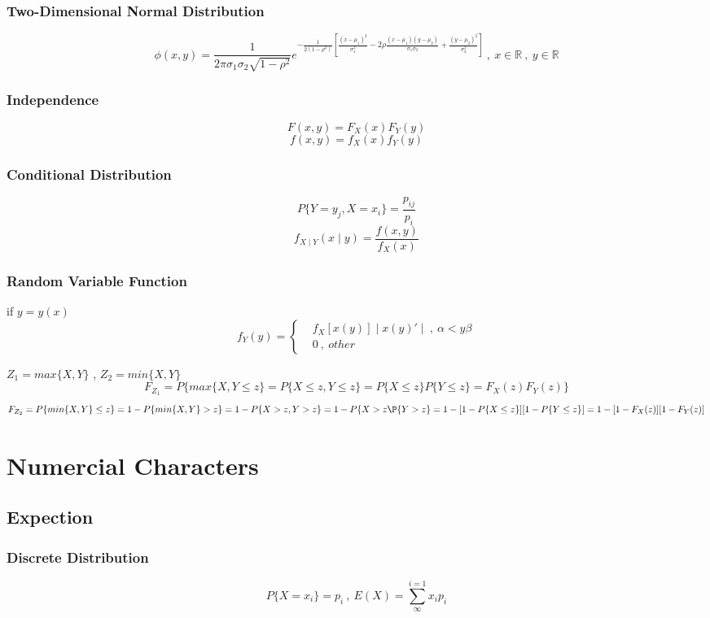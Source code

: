 \documentclass{ctexart}
\begin{document}
\subsubsection{Two-Dimensional Normal Distribution}
\[\phi(x,y)=\frac{1}{2\pi \sigma_1\sigma_2\sqrt{1-\rho^2}}e^{-\frac{1}{2(1-\rho^2)}[\frac{(x-\mu_1)^2}{\sigma_1^2}-2\rho\frac{(x-\mu_1)(y-\mu_2)}{\sigma_1\sigma_2}+\frac{(y-\mu_2)^2}{\sigma_2^2}]}\ , \ x\in\mathbb{R}\ , \ y\in \mathbb{R}\]

\subsubsection{Independence}
\[F(x,y)=F_X(x)F_Y(y)\]
\[f(x,y)=f_X(x)f_Y(y)\]

\subsubsection{Conditional Distribution}
\[P\{Y=y_j,X=x_i\}=\frac{p_{ij}}{p_i}\]
\[f_{X\mid Y}(x\mid y)=\frac{f(x,y)}{f_X(x)}\]

\subsubsection{Random Variable Function}
if \(y=y(x)\)
\[
f_Y(y)=
\left\{
\begin{aligned}
&f_X[x(y)]\mid x(y)'\mid \ , \ \alpha < y \beta\\
&0 \ ,\ other
\end{aligned}
\right.
\]

\vspace{12 pt}
\(Z_1=max\{X,Y\}\) , \(Z_2=min\{X,Y\}\)
\[F_{Z_1}=P\{max\{X,Y\leq z\}=P\{X\leq z , Y\leq z\}=P\{X\leq z\}P\{Y\leq z\}=F_X(z)F_Y(z)\}\]
\[F_{Z_2}=P\{min\{X,Y\}\leq z\}=1-P\{min\{X,Y\}>z\}=1-P\{X>z,Y>z\}=1-P\{X>z\P\{Y>z\}=1-[1-P\{X\leq z\}][1-P\{Y\leq z\}]=1-[1-F_X(z)][1-F_Y(z)]   \]


\newpage
\section{Numercial Characters}
\subsection{Expection}
\subsubsection{Discrete Distribution}
\[P\{X=x_i\}=p_i\ , \ E(X)=\sum_{\infty}^{i=1}x_ip_i\]
\end{document}
